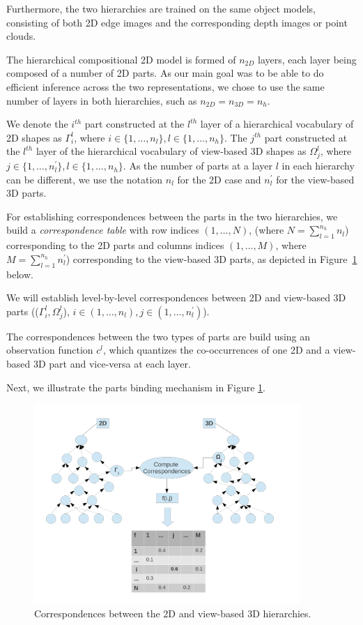 \documentclass[runningheads]{llncs}
\begin{document}
Furthermore, the two hierarchies are trained on the same object models, consisting of both 2D edge images and the corresponding depth images or point clouds.  

The hierarchical compositional 2D model is formed of $n_{2D}$ layers, each layer being composed of a number of 2D parts. 
As our main goal was to be able to do efficient inference across the two representations, we chose to use the same number of layers in both hierarchies, such as $n_{2D}=n_{3D}=n_h$.

We denote the $i^{th}$ part constructed at the $l^{th}$ layer of a  hierarchical vocabulary of 2D shapes as $\Gamma_{i}^{l}$, where $i \in \{1,\ldots,n_{l}\}, l \in \{1,\ldots,n_h\}$. The $j^{th}$ part constructed at the $l^{th}$ layer of the  hierarchical vocabulary of view-based 3D shapes as $\Omega_{j}^{l}$, where $j \in \{1,\ldots,n_{l}^{'}\}, {l} \in \{1,\ldots,n_h\}$. As the number of parts at a layer $l$ in each hierarchy can be different, we use the notation $n_l$ for the 2D case and $n_l^{'}$ for the view-based 3D parts. 

For establishing correspondences between the parts in the two hierarchies, we build a \emph{correspondence table} with row indices $(1,\dots,N)$, (where $N=\sum_{l=1}^{n_h} {n_l}$) corresponding to the 2D parts and columns indices $(1,\dots,M)$, where $M=\sum_{l=1}^{n_h} {n_{l}^ {'}}$) corresponding to the view-based 3D parts, as depicted in Figure~\ref{fig:fused-models} below. 

We will establish level-by-level correspondences between 2D and view-based 3D  parts (($\Gamma_{i}^l,\Omega_{j}^l$), $i \in (1,\ldots,n_l), j \in (1,\ldots,n_{l}^{'})$).

The correspondences between the two types of parts are build using an observation function $c^l$, which quantizes the co-occurrences of one 2D and a view-based 3D part and vice-versa at each layer. 

Next, we illustrate the parts binding mechanism in Figure \ref{fig:fused-models}.

\begin{figure}
\begin{center}
\includegraphics[width=0.9\textwidth]{Fused_representation}
\end{center}
\caption{Correspondences between the 2D and view-based 3D hierarchies.}
\label{fig:fused-models}
\end{figure}
\end{document}
